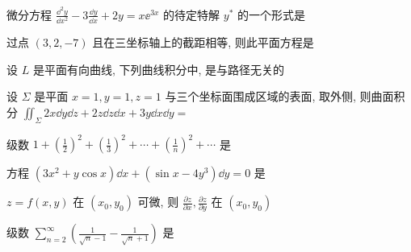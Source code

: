 \begin{ti}
	微分方程 $\frac{\dd^{2} y}{\dd{x}^{2}}-3 \frac{\dd{y}}{\dd{x}}+2 y=x \ee^{3 x}$ 的待定特解 $y^{*}$ 的一个形式是 \kuo
\end{ti}

\begin{ti}
	过点 $(3,2,-7)$  且在三坐标轴上的截距相等, 则此平面方程是 \kuo
\end{ti}

\begin{ti}
	设 $L$ 是平面有向曲线, 下列曲线积分中, \kuo 是与路径无关的
\end{ti}

\begin{ti}
	设 $\Sigma$ 是平面 $x=1, y=1, z=1$ 与三个坐标面围成区域的表面, 取外侧, 则曲面积分 $\iint_{\Sigma} 2 x \dd{y} \dd{z}+2 z \dd{z} \dd{x}+3 y \dd{x} \dd{y}=$ \kuo
\end{ti}

\begin{ti}
	级数 $1+\left(\frac{1}{2}\right)^{2}+\left(\frac{1}{3}\right)^{2}+\cdots+\left(\frac{1}{n}\right)^{2}+\cdots$ 是 \kuo
\end{ti}

\begin{ti}
	方程 $\left(3 x^{2}+y \cos x\right) \dd{x}+\left(\sin x-4 y^{3}\right) \dd{y}=0$ 是 \kuo
\end{ti}

\begin{ti}
	$z=f(x, y)$ 在 $\left(x_{0}, y_{0}\right)$ 可微, 则 $\frac{\partial z}{\partial x}, \frac{\partial z}{\partial y}$ 在 $\left(x_{0}, y_{0}\right)$ \kuo
\end{ti}

\begin{ti}
	级数 $\sum_{n=2}^{\infty}\left(\frac{1}{\sqrt{n}-1}-\frac{1}{\sqrt{n}+1}\right)$ 是 \kuo
\end{ti}

